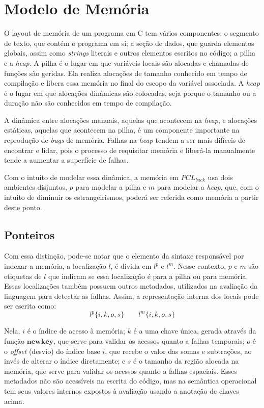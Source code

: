 \section{Modelo de Memória}

O layout de memória de um programa em C tem vários componentes: o segmento de texto, que contém o programa em si; a seção de dados, que guarda elementos globais, assim como \emph{strings} literais e outros elementos escritos no código; a pilha e a \emph{heap}. A pilha é o lugar em que variáveis locais são alocadas e chamadas de funções são geridas. Ela realiza alocações de tamanho conhecido em tempo de compilação e libera essa memória no final do escopo da variável associada. A \emph{heap} é o lugar em que alocações dinâmicas são colocadas, seja porque o tamanho ou a duração não são conhecidos em tempo de compilação.

A dinâmica entre alocações manuais, aquelas que acontecem na \emph{heap}, e alocações estáticas, aquelas que acontecem na pilha, é um componente importante na reprodução de \emph{bugs} de memória. Falhas na \emph{heap} tendem a ser mais difíceis de encontrar e lidar, pois o processo de requisitar memória e liberá-la manualmente tende a aumentar a superfície de falhas. 

Com o intuito de modelar essa dinâmica, a memória em $PCL_{back}$ usa dois ambientes disjuntos, $p$ para modelar a pilha e $m$ para modelar a \emph{heap}, que, com o intuito de diminuir os estrangeirismos, poderá ser referida como memória a partir deste ponto. 

\subsection{Ponteiros}
\label{sec:pcl-back:ptr}

Com essa distinção, pode-se notar que o elemento da sintaxe responsável por indexar a memória, a localização $l$, é divida em $l^p$ e $l^m$. Nesse contexto, $p$ e $m$ são etiquetas de $l$ que indicam se essa localização é para a pilha ou para memória. Essas localizações também possuem outros metadados, utilizados na avaliação da linguagem para detectar as falhas. Assim, a representação interna dos locais pode ser escrita como:
\[ l^p\{i, k, o, s \} \quad\quad l^m\{i, k, o, s \} \]

Nela, $i$ é o índice de acesso à memória; $k$ é a uma chave única, gerada através da função $\mathbf{newkey}$, que serve para validar os acessos quanto a falhas temporais; $o$ é o \emph{offset} (desvio) do índice base $i$, que recebe o valor das somas e subtrações, ao invés de alterar o índice diretamente; e $s$ é o tamanho da região alocada na memória, que serve para validar os acessos quanto a falhas espaciais. Esses metadados não são acessíveis na escrita do código, mas na semântica operacional tem seus valores internos expostos à avaliação usando a anotação de chaves acima.

